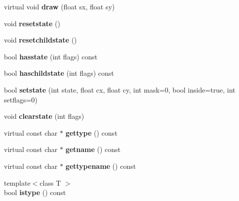 \begin{DoxyCompactItemize}
virtual void {\bfseries draw} (float sx, float sy)
\item 
\mbox{\label{struct_u_i_1_1_object_ab0ea9317ff8bfaff7493a50a83e12e1f}} 
void {\bfseries resetstate} ()
\item 
\mbox{\label{struct_u_i_1_1_object_a63f209bed83f5b12605be88101fbbba8}} 
void {\bfseries resetchildstate} ()
\item 
\mbox{\label{struct_u_i_1_1_object_a388b71264b81004adda4097b588b5cf1}} 
bool {\bfseries hasstate} (int flags) const
\item 
\mbox{\label{struct_u_i_1_1_object_ad03775f8cdfda71e8382ae4d4a8e2bc6}} 
bool {\bfseries haschildstate} (int flags) const
\item 
\mbox{\label{struct_u_i_1_1_object_a02163b59df39c082133e867366b8fc96}} 
bool {\bfseries setstate} (int state, float cx, float cy, int mask=0, bool inside=true, int setflags=0)
\item 
\mbox{\label{struct_u_i_1_1_object_ac70f7cfacdb4b2e4f075190bce499058}} 
void {\bfseries clearstate} (int flags)
\item 
\mbox{\label{struct_u_i_1_1_object_a5a662838e11d2028f99a9d8c33ae7117}} 
virtual const char $\ast$ {\bfseries gettype} () const
\item 
\mbox{\label{struct_u_i_1_1_object_a1bf68b1c798e938a58762ec095971944}} 
virtual const char $\ast$ {\bfseries getname} () const
\item 
\mbox{\label{struct_u_i_1_1_object_a9487735322bf239b7db18c9d25e4e982}} 
virtual const char $\ast$ {\bfseries gettypename} () const
\item 
\mbox{\label{struct_u_i_1_1_object_af10fcb312929617cfd6a8058c906f826}} 
{\footnotesize template$<$class T $>$ }\\bool {\bfseries istype} () const
\item 
\mbox{\label{struct_u_i_1_1_object_af7584922c28fdc35e443be4369dbcbab}} 

\end{DoxyCompactItemize}
